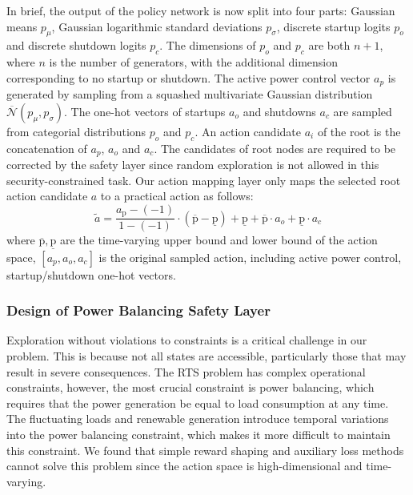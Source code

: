 In brief, the output of the policy network is now split into four parts: Gaussian means $p_\mu$, Gaussian logarithmic standard deviations $p_\sigma$, discrete startup logits $p_o$ and discrete shutdown logits $p_c$. The dimensions of $p_o$ and $p_c$ are both $n+1$, where $n$ is the number of generators, with the additional dimension corresponding to no startup or shutdown. The active power control vector $a_p$ is generated by sampling from a squashed multivariate Gaussian distribution $\overline{\mathcal{N}}(p_\mu, p_\sigma)$. The one-hot vectors of startups $a_o$ and shutdowns $a_c$ are sampled from categorial distributions $p_o$ and $p_c$. An action candidate $a_i$ of the root is the concatenation of $a_p$, $a_o$ and $a_c$. The candidates of root nodes are required to be corrected by the safety layer since random exploration is not allowed in this security-constrained task. Our action mapping layer only maps the selected root action candidate $a$ to a practical action as follows:
\begin{equation}
    \tilde{a} = 
    \frac{a_\text{p}-(-1)}{1-(-1)}
    \cdot(\overline{\text{p}}-\underline{\text{p}})+\underline{\text{p}}+\overline{\text{p}}\cdot a_o+\underline{\text{p}}\cdot a_c
\end{equation}
where $\overline{\text{p}}, \underline{\text{p}}$ are the time-varying upper bound and lower bound of the action space, $[a_p, a_o, a_c]$ is the original sampled action, including active power control, startup/shutdown one-hot vectors.


\subsubsection*{Design of Power Balancing Safety Layer}
Exploration without violations to constraints is a critical challenge in our problem. This is because not all states are accessible, particularly those that may result in severe consequences. 
The RTS problem has complex operational constraints, however, the most crucial constraint is power balancing, which requires that the power generation be equal to load consumption at any time.
The fluctuating loads and renewable generation introduce temporal variations into the power balancing constraint, which makes it more difficult to maintain this constraint.
We found that simple reward shaping and auxiliary loss methods cannot solve this problem since the action space is high-dimensional and time-varying. 

